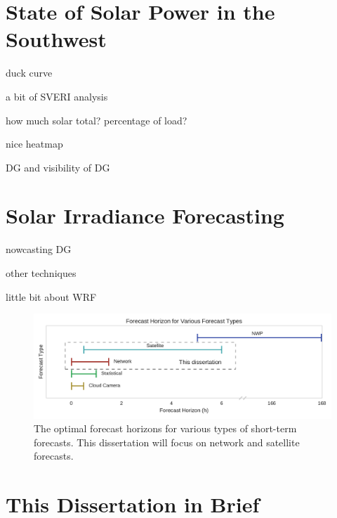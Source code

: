 \section{State of Solar Power in the Southwest}
duck curve

a bit of SVERI analysis

how much solar total?
percentage of load?

nice heatmap

DG and visibility of DG


\section{Solar Irradiance Forecasting}
nowcasting DG

other techniques

little bit about WRF

\begin{figure}[h]
\includegraphics[width=\textwidth]{figs/fxhoriz.pdf}
\caption[Forecast horizon for various forecast types]{The optimal
  forecast horizons for various types of short-term forecasts. This
  dissertation will focus on network and satellite forecasts.}
\label{fig:fxhoriz}
\end{figure}


\section{This Dissertation in Brief}

